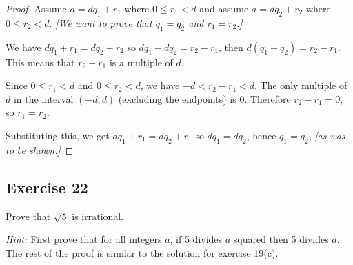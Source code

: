 \documentclass[14pt]{extarticle}
\begin{document}
\begin{proof}
Assume $a = dq_1 + r_1$ where $0 \leq r_1 < d$ and assume $a = dq_2 + r_2$ where $0 \leq r_2 < d$. {\it [We want to prove that $q_1 = q_2$ and $r_1 = r_2$.]}

We have $dq_1 + r_1 = dq_2 + r_2$ so $dq_1 - dq_2 = r_2 - r_1$, then $d(q_1 - q_2) = r_2 - r_1$. This means that $r_2 - r_1$ is a multiple of $d$.

Since $0 \leq r_1 < d$ and $0 \leq r_2 < d$, we have $-d < r_2 - r_1 < d$. The only multiple of $d$ in the interval $(-d, d)$ (excluding the endpoints) is 0. Therefore $r_2 - r_1 = 0$, so $r_1 = r_2$.

Substituting this, we get $dq_1 + r_1 = dq_2 + r_1$ so $dq_1 = dq_2$, hence $q_1 = q_2$, {\it [as was to be shown.]}
\end{proof}

\subsection{Exercise 22}
Prove that $\sqrt{5}$ is irrational.

{\it Hint:} First prove that for all integers $a$, if 5 divides $a$ squared then 5 divides $a$. The rest of the proof is similar to the solution for exercise 19(c).
\end{document}
